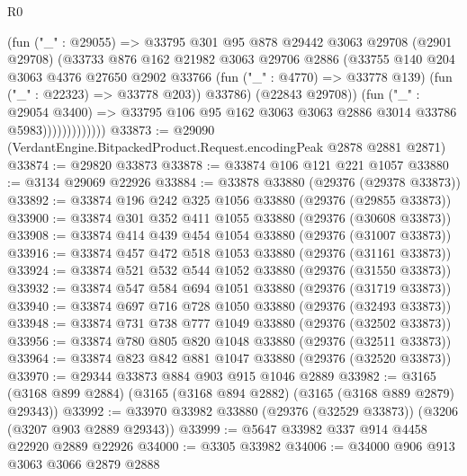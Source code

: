 \begin{lexlean}{R0}
\begin{coremodule}
                            (fun ("_" : @29055) =>
                            @33795
                              @301
                              @95
                              @878
                              @29442
                              @3063
                              @29708
                              (@2901 @29708)
                              (@33733
                                @876
                                @162
                                @21982
                                @3063
                                @29706
                                @2886
                                (@33755
                                  @140
                                  @204
                                  @3063
                                  @4376
                                  @27650
                                  @2902
                                  @33766
                                  (fun ("_" : @4770) => @33778 @139)
                                  (fun ("_" : @22323) => @33778 @203))
                                @33786)
                              (@22843 @29708))
                            (fun ("_" : @29054 @3400) =>
                            @33795 @106 @95 @162 @3063 @3063 @2886 @3014 @33786 @5983)))))))))))))
@33873 := @29090 (VerdantEngine.BitpackedProduct.Request.encodingPeak @2878 @2881 @2871)
@33874 := @29820 @33873
@33878 := @33874 @106 @121 @221 @1057
@33880 := @3134 @29069 @22926
@33884 := @33878 @33880 (@29376 (@29378 @33873))
@33892 := @33874 @196 @242 @325 @1056 @33880 (@29376 (@29855 @33873))
@33900 := @33874 @301 @352 @411 @1055 @33880 (@29376 (@30608 @33873))
@33908 := @33874 @414 @439 @454 @1054 @33880 (@29376 (@31007 @33873))
@33916 := @33874 @457 @472 @518 @1053 @33880 (@29376 (@31161 @33873))
@33924 := @33874 @521 @532 @544 @1052 @33880 (@29376 (@31550 @33873))
@33932 := @33874 @547 @584 @694 @1051 @33880 (@29376 (@31719 @33873))
@33940 := @33874 @697 @716 @728 @1050 @33880 (@29376 (@32493 @33873))
@33948 := @33874 @731 @738 @777 @1049 @33880 (@29376 (@32502 @33873))
@33956 := @33874 @780 @805 @820 @1048 @33880 (@29376 (@32511 @33873))
@33964 := @33874 @823 @842 @881 @1047 @33880 (@29376 (@32520 @33873))
@33970 := @29344 @33873 @884 @903 @915 @1046 @2889
@33982 := @3165 (@3168 @899 @2884) (@3165 (@3168 @894 @2882) (@3165 (@3168 @889 @2879) @29343))
@33992 := @33970 @33982 @33880 (@29376 (@32529 @33873)) (@3206 (@3207 @903 @2889 @29343))
@33999 := @5647 @33982 @337 @914 @4458 @22920 @2889 @22926
@34000 := @3305 @33982
@34006 := @34000 @906 @913 @3063 @3066 @2879 @2888

\end{coremodule}
\end{lexlean}
